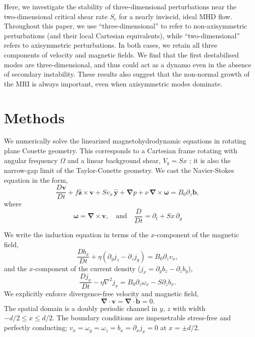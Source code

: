 \documentclass[openacc]{rsproca_new}%
\begin{document}
Here, we investigate the stability of three-dimensional perturbations near the two-dimensional critical shear rate $S_{c}$ for a nearly inviscid, ideal MHD flow.
Throughout this paper, we use ``three-dimensional'' to refer to non-axisymmetric perturbations (and their local Cartesian equivalents), while ``two-dimensional'' refers to axisymmetric perturbations.
In both cases, we retain all three components of velocity and magnetic fields.
We find that the first destabilised modes are three-dimensional, and thus could act as a dynamo even in the absence of secondary instability.
These results also suggest that the non-normal growth of the MRI is always important, even when axisymmetric modes dominate.

\section{Methods}
\label{sec:methods}

We numerically solve the linearized magnetohydrodynamic equations in rotating plane Couette geometry.
This corresponds to a Cartesian frame rotating with angular frequency $\Omega$ and a linear background shear, $V_{y}=Sx$ \cite{2015RSPSA.47140699V}; it is also the narrow-gap limit of the Taylor-Couette geometry.
We cast the Navier-Stokes equation in the form,
\begin{equation}\label{eq:mhd}
\frac{D \boldsymbol{v}}{Dt}+f \boldsymbol{\hat{z}}\times\boldsymbol{v}+{S}v_{x}\,\boldsymbol{\hat{y}}+\boldsymbol{\nabla}{p}+\nu\,\boldsymbol{\nabla}\times\boldsymbol{\omega}=B_{0}\partial_{z}\boldsymbol{b},
\end{equation}
where
\begin{equation}
\boldsymbol{\omega}=\boldsymbol{\nabla}\times\boldsymbol{v},\quad\text{and}\quad\frac{D}{Dt}=\partial_{t}+{S}x\,\partial_{y}\end{equation}

We write the induction equation in terms of the $x$-component of the magnetic field,
\begin{equation}\label{eq:Bx}
\frac{Db_{x}}{Dt}+\eta(\partial_{y}j_{z}-\partial_{z}j_{y})=B_{0}\partial_{z}v_{x},
\end{equation}
and the $x$-component of the current density ($j_{x}=\partial_{y}b_{z}-\partial_{z}b_{y}$),
\begin{equation}\label{eq:Jx}
\frac{Dj_{x}}{Dt}-\eta\nabla^{2}j_{x}=B_{0}\partial_{z}\omega_{x}-S\partial_{z}b_{x}.
\end{equation}
We explicitly enforce divergence-free velocity and magnetic field,
\begin{equation}\label{eq:divu}
 \boldsymbol{\nabla}\cdot\boldsymbol{v}=\boldsymbol{\nabla}\cdot\boldsymbol{b}=0.
\end{equation}
The spatial domain is a doubly periodic channel in $y,\,z$ with width $-d/2\le{x}\le d/2$.
The boundary conditions are impenetrable stress-free and perfectly conducting; $v_{x}=\omega_{y}=\omega_{z}=b_{x}=\partial_{x}j_{x}=0$ at $x=\pm{d/2}$. 
\end{document}
